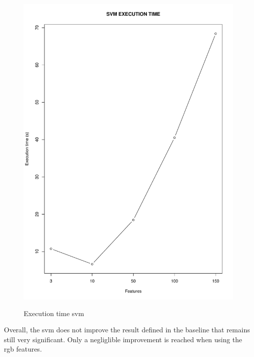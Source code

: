 \documentclass{article}
\begin{document}
\begin{figure}[H]
\begin{adjustwidth}{-4cm}{-4cm}
{    \includegraphics[scale=0.3]{../svm_time_rgb.pdf}  
     }
     \centering
     \caption{Execution time svm}  \label{svm time} 
      \end{adjustwidth}
   \end{figure}
\noindent Overall, the svm does not improve the result defined in the baseline that remains still very significant. Only a negliglible improvement is reached when using the rgb features. \\
\end{document}
